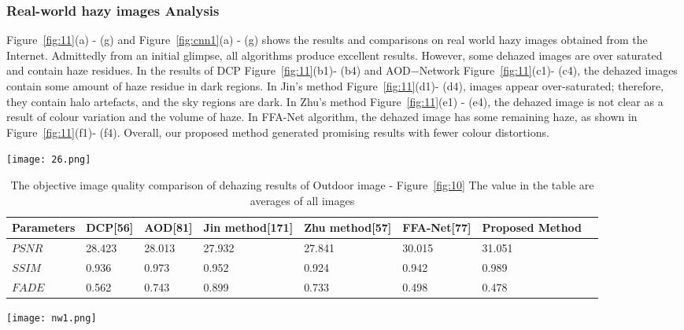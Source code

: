 \documentclass[doctor,english,listoffigures,listoftables]{thesis-uestc}
\begin{document}
\subsubsection{Real-world hazy images Analysis}
Figure~\ref{fig:11}(a) - (g) and Figure~\ref{fig:cnn1}(a) - (g) shows the results and comparisons on real world hazy images obtained from the Internet. Admittedly from an initial glimpse, all algorithms produce excellent results. However, some dehazed images are over saturated and contain haze residues. In the results of DCP Figure~\ref{fig:11}(b1)- (b4) and AOD$-$Network Figure~\ref{fig:11}(c1)- (c4), the dehazed images contain some amount of haze residue in dark regions. In Jin's method Figure~\ref{fig:11}(d1)- (d4), images appear over-saturated; therefore, they contain halo artefacts, and the sky regions are dark. In Zhu's method Figure~\ref{fig:11}(e1) - (e4), the dehazed image is not clear as a result of colour variation and the volume of haze. In FFA-Net algorithm, the dehazed image has some remaining haze, as shown in Figure~\ref{fig:11}(f1)- (f4). Overall, our proposed method generated promising results with fewer colour distortions.

\begin{figure*}
	\centering
	\texttt{[image: 26.png]}
	\caption{ Visual comparison of results on real world hazy images: (a) Input hazy image;(b) DCP [56]; (c) AOD−Network [81]; (d) Jin method [171]; (e) Zhu method [57]; (f) FFA-Net [77] ; (g) Proposed method.}
	\label{fig:11}
\end{figure*}

\begin{table}
	\centering
	\caption{The objective image quality comparison of dehazing results of Outdoor image - Figure~\ref{fig:10} The value in the table are averages of all images}
    \begin{tabular}{|p{49pt}|p{52pt}|p{52pt}|p{52pt}|p{52pt}|p{52pt}|p{52pt}|p{52pt}|}
    
	\hline\textbf{Parameters}	& \textbf{DCP[56]}& \textbf{AOD[81]} &  \textbf{Jin method[171]}& \textbf{Zhu method[57]} & \textbf{FFA-Net[77]}  &  \textbf{Proposed Method}\\
	\hline
	$PSNR$&  28.423 & 28.013 & 27.932 & 27.841 & 30.015 & 31.051\\
		\hline	
	$SSIM$& 0.936 & 0.973 & 0.952 & 0.924 & 0.942&0.989\\
		\hline	
	$FADE$& 0.562 & 0.743 & 0.899 & 0.733 & 0.498&0.478\\
	\hline	
\end{tabular}
	\label{Tab7}
\end{table}
\begin{figure*}[!htb]
	\centering
	\texttt{[image: nw1.png]}
	\caption{ Visual comparison of results on real world hazy images: (a) Input hazy image;(b) DehazeNet[75]; (c) MSCNN [70]; (d) NBPS [71]; (e) Proposed method.}
	\label{fig:cnn1}
\end{figure*}
\end{document}
